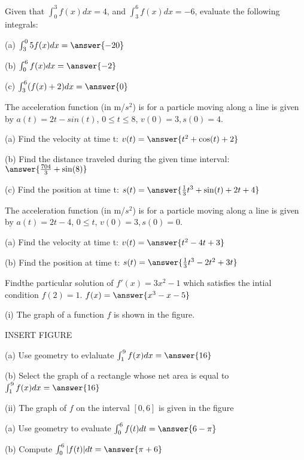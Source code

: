 \documentclass{ximera}
\begin{document}
\begin{exercise}
Given that $\int_0^3f(x)dx=4$, and $\int_3^6f(x)dx=-6$, evaluate the following integrals:

(a) $\int_3^0 5f(x)dx=\answer{-20}$

(b) $\int_0^6 f(x)dx=\answer{-2}$

(c) $\int_3^6 (f(x)+2)dx=\answer{0}$
\end{exercise}

\begin{exercise}
The acceleration function (in m/$s^2$) is for a particle moving along a line is given by $a(t)=2t-sin(t)$, $0\leq t\leq 8$, $v(0)=3, s(0)=4$.

(a) Find the velocity at time t: $v(t)=\answer{t^2+\cos(t)+2}$

(b) Find the distance traveled during the given time interval: $\answer{\frac{704}{3}+\sin(8)}$

(c) Find the position at time t: $s(t)=\answer{\frac{1}{3}t^3+\sin(t)+2t+4}$
\end{exercise}

\begin{exercise}
The acceleration function (in m/$s^2$) is for a particle moving along a line is given by $a(t)=2t-4$, $0\leq t$, $v(0)=3, s(0)=0$.

(a) Find the velocity at time t: $v(t)=\answer{t^2-4t+3}$

(b) Find the position at time t: $s(t)=\answer{\frac{1}{3}t^3-2t^2+3t}$
\end{exercise}

\begin{exercise}
Findthe particular solution of $f'(x)=3x^2-1$ which satisfies the intial condition $f(2)=1$. $f(x)=\answer{x^3-x-5}$
\end{exercise}

\begin{exercise}
(i) The graph of a function $f$ is shown in the figure.

INSERT FIGURE

(a) Use geometry to evlaluate $\int_1^9 f(x)dx=\answer{16}$

(b) Select the graph of a rectangle whose net area is equal to $\int_1^9 f(x)dx=\answer{16}$

(ii) The graph of $f$ on the interval $[0,6]$ is given in the figure

(a) Use geometry to evaluate $\int_0^6 f(t)dt=\answer{6-\pi}$

(b) Compute $\int_0^6 |f(t)|dt=\answer{\pi+6}$
\end{exercise}
\end{document}

